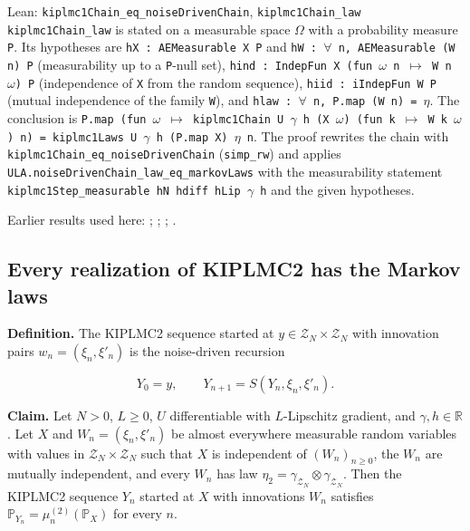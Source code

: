 \documentclass[11pt,a4paper]{report}
\begin{document}
\begin{leanbox}{Lean: \texttt{kiplmc1Chain\_\allowbreak{}eq\_\allowbreak{}noiseDrivenChain}, \texttt{kiplmc1Chain\_\allowbreak{}law}}
\texttt{kiplmc1\allowbreak{}Chain\_\allowbreak{}law} is stated on a measurable space \texttt{\ensuremath{\Omega}} with a probability measure \texttt{P}. Its hypotheses are \texttt{h\allowbreak{}X : AEMeasurable X P} and \texttt{h\allowbreak{}W : \ensuremath{\forall} n, AEMeasurable (W n) P} (measurability up to a \texttt{P}-null set), \texttt{hind : Indep\allowbreak{}Fun X (fun \ensuremath{\omega} n \ensuremath{\mapsto} W n \ensuremath{\omega}) P} (independence of \texttt{X} from the random sequence), \texttt{hiid : i\allowbreak{}Indep\allowbreak{}Fun W P} (mutual independence of the family \texttt{W}), and \texttt{hlaw : \ensuremath{\forall} n, P.\allowbreak{}map (W n) = \ensuremath{\eta}}. The conclusion is \texttt{P.\allowbreak{}map (fun \ensuremath{\omega} \ensuremath{\mapsto} kiplmc1\allowbreak{}Chain U \ensuremath{\gamma} h (X \ensuremath{\omega}) (fun k \ensuremath{\mapsto} W k \ensuremath{\omega}) n) = kiplmc1\allowbreak{}Laws U \ensuremath{\gamma} h (P.\allowbreak{}map X) \ensuremath{\eta} n}. The proof rewrites the chain with \texttt{kiplmc1\allowbreak{}Chain\_\allowbreak{}eq\_\allowbreak{}noise\allowbreak{}Driven\allowbreak{}Chain} (\texttt{simp\_\allowbreak{}rw}) and applies \texttt{ULA.\allowbreak{}noise\allowbreak{}Driven\allowbreak{}Chain\_\allowbreak{}law\_\allowbreak{}eq\_\allowbreak{}markov\allowbreak{}Laws} with the measurability statement \texttt{kiplmc1\allowbreak{}Step\_\allowbreak{}measurable h\allowbreak{}N hdiff h\allowbreak{}Lip \ensuremath{\gamma} h} and the given hypotheses.
\end{leanbox}


Earlier results used here: \cite[Section~3.20.1]{LangevinLean2026ULASC}; \cite[Section~3.20.3]{LangevinLean2026ULASC}; \cite[Section~3.33.12]{LangevinLean2026ULASC}; \cite[Section~3.1.1]{LangevinLean2026IPLA}.
\subsection{\texorpdfstring{Every realization of KIPLMC2 has the Markov laws}{Every realization of KIPLMC2 has the Markov laws}}
\label{report-step-KIPLMC-Laws-lean-5}


\textbf{Definition.} The KIPLMC2 sequence started at \(y\in\mathcal Z_N\times\mathcal Z_N\) with innovation pairs \(w_n=(\xi_n,\xi'_n)\) is the noise-driven recursion


\[Y_0=y,\qquad Y_{n+1}=S(Y_n,\xi_n,\xi'_n).\]


\textbf{Claim.} Let \(N>0\), \(L\ge0\), \(U\) differentiable with \(L\)-Lipschitz gradient, and \(\gamma,h\in\mathbb R\). Let \(X\) and \(W_n=(\xi_n,\xi'_n)\) be almost everywhere measurable random variables with values in \(\mathcal Z_N\times\mathcal Z_N\) such that \(X\) is independent of \((W_n)_{n\ge0}\), the \(W_n\) are mutually independent, and every \(W_n\) has law \(\eta_2=\gamma_{\mathcal Z_N}\otimes\gamma_{\mathcal Z_N}\). Then the KIPLMC2 sequence \(Y_n\) started at \(X\) with innovations \(W_n\) satisfies \(\mathbb P_{Y_n}=\mu^{(2)}_n(\mathbb P_X)\) for every \(n\).
\end{document}
